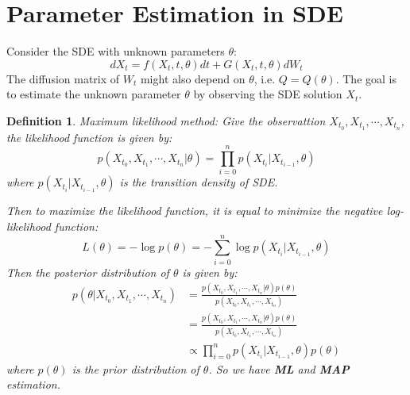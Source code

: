 \documentclass{article}
\newtheorem{definition}{Definition}
\begin{document}
\section{Parameter Estimation in SDE}
Consider the SDE with unknown parameters $\theta$:
\begin{equation}
    dX_t = f(X_t, t, \theta)dt + G(X_t, t, \theta)dW_t
\end{equation}
The diffusion matrix of $W_t$ might also depend on $\theta$, i.e. $Q=Q(\theta)$.
The goal is to estimate the unknown parameter $\theta$ by observing the SDE solution $X_t$.
\begin{definition}
    Maximum likelihood method:
    Give the observattion $X_{t_0}, X_{t_1}, \cdots, X_{t_n}$, the likelihood function is given by:
    \begin{equation}
        p(X_{t_0}, X_{t_1}, \cdots, X_{t_n}|\theta) = \prod_{i=0}^{n} p(X_{t_i}|X_{t_{i-1}}, \theta)
    \end{equation}
    where $p(X_{t_i}|X_{t_{i-1}}, \theta)$ is the transition density of SDE.

    Then to maximize the likelihood function, it is equal to minimize the negative log-likelihood function:
    \begin{equation}
        L(\theta) = -\log p(\theta) = -\sum_{i=0}^{n} \log p(X_{t_i}|X_{t_{i-1}}, \theta)
    \end{equation}
    Then the posterior distribution of $\theta$ is given by:
    \begin{equation}
        \begin{aligned}
            p(\theta|X_{t_0}, X_{t_1}, \cdots, X_{t_n}) &= \frac{p(X_{t_0}, X_{t_1}, \cdots, X_{t_n}|\theta)p(\theta)}{p(X_{t_0}, X_{t_1}, \cdots, X_{t_n})}\\
            &= \frac{p(X_{t_0}, X_{t_1}, \cdots, X_{t_n}|\theta)p(\theta)}{p(X_{t_0}, X_{t_1}, \cdots, X_{t_n})}\\
            &\propto \prod_{i=0}^{n} p(X_{t_i}|X_{t_{i-1}}, \theta)p(\theta)
        \end{aligned}
    \end{equation}
    where $p(\theta)$ is the prior distribution of $\theta$. So we have \textbf{ML} and \textbf{MAP} estimation.
\end{definition}
\end{document}
